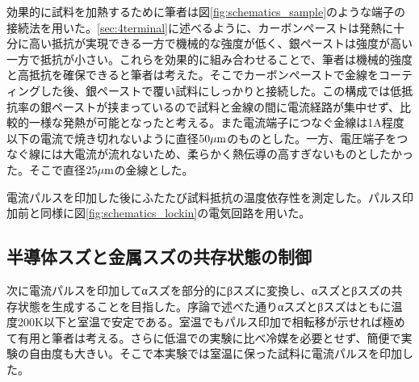 効果的に試料を加熱するために筆者は図\ref{fig:schematics_sample}のような端子の接続法を用いた。\ref{sec:4terminal}に述べるように、カーボンペーストは発熱に十分に高い抵抗が実現できる一方で機械的な強度が低く、銀ペーストは強度が高い一方で抵抗が小さい。これらを効果的に組み合わせることで、筆者は機械的強度と高抵抗を確保できると筆者は考えた。そこでカーボンペーストで金線をコーティングした後、銀ペーストで覆い試料にしっかりと接続した。この構成では低抵抗率の銀ペーストが挟まっているので試料と金線の間に電流経路が集中せず、比較的一様な発熱が可能となったと考える。また電流端子につなぐ金線は1A程度以下の電流で焼き切れないように直径$\rm 50 \mu m$のものとした。一方、電圧端子をつなぐ線には大電流が流れないため、柔らかく熱伝導の高すぎないものとしたかった。そこで直径$\rm 25 \mu m$の金線とした。

電流パルスを印加した後にふたたび試料抵抗の温度依存性を測定した。パルス印加前と同様に図\ref{fig:schematics_lockin}の電気回路を用いた。

\subsection{半導体スズと金属スズの共存状態の制御}
次に電流パルスを印加してαスズを部分的にβスズに変換し、αスズとβスズの共存状態を生成することを目指した。序論で述べた通りαスズとβスズはともに温度200K以下と室温で安定である。室温でもパルス印加で相転移が示せれば極めて有用と筆者は考える。さらに低温での実験に比べ冷媒を必要とせず、簡便で実験の自由度も大きい。そこで本実験では室温に保った試料に電流パルスを印加した。

